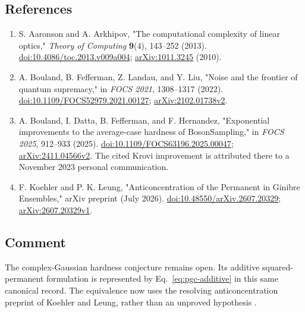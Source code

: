 \subsection*{References}

\begin{enumerate}[label={},leftmargin=4.8em,labelsep=0.5em]
  \footnotesize
  \item[\textup{[AA13]}]\label{ref:pgc-aa}
  S. Aaronson and A. Arkhipov,
"The computational complexity of linear optics,"
\emph{Theory of Computing} \textbf{9}(4), 143--252 (2013).
\href{https://doi.org/10.4086/toc.2013.v009a004}{doi:10.4086/toc.2013.v009a004};
\href{https://arxiv.org/abs/1011.3245}{arXiv:1011.3245} (2010).

  \item[\textup{[BFLL22]}]\label{ref:pgc-bfll}
  A. Bouland, B. Fefferman, Z. Landau, and Y. Liu,
"Noise and the frontier of quantum supremacy,"
in \emph{FOCS 2021}, 1308--1317 (2022).
\href{https://doi.org/10.1109/FOCS52979.2021.00127}{doi:10.1109/FOCS52979.2021.00127};
\href{https://arxiv.org/abs/2102.01738v2}{arXiv:2102.01738v2}.

  \item[\textup{[BDFH25]}]\label{ref:pgc-bdfh}
  A. Bouland, I. Datta, B. Fefferman, and F. Hernandez,
"Exponential improvements to the average-case hardness of BosonSampling,"
in \emph{FOCS 2025}, 912--933 (2025).
\href{https://doi.org/10.1109/FOCS63196.2025.00047}{doi:10.1109/FOCS63196.2025.00047};
\href{https://arxiv.org/abs/2411.04566v2}{arXiv:2411.04566v2}.
The cited Krovi improvement is attributed there to a November 2023 personal communication.

  \item[\textup{[KL26]}]\label{ref:pgc-kl}
  F. Koehler and P. K. Leung,
"Anticoncentration of the Permanent in Ginibre Ensembles,"
arXiv preprint (July 2026).
\href{https://doi.org/10.48550/arXiv.2607.20329}{doi:10.48550/arXiv.2607.20329};
\href{https://arxiv.org/abs/2607.20329v1}{arXiv:2607.20329v1}.
\end{enumerate}

\subsection*{Comment}

The complex-Gaussian hardness conjecture remains open.
Its additive squared-permanent formulation is represented by Eq.~\eqref{eq:pgc-additive} in this same canonical record.
The equivalence now uses the resolving anticoncentration preprint of Koehler and Leung, rather than an unproved hypothesis .

